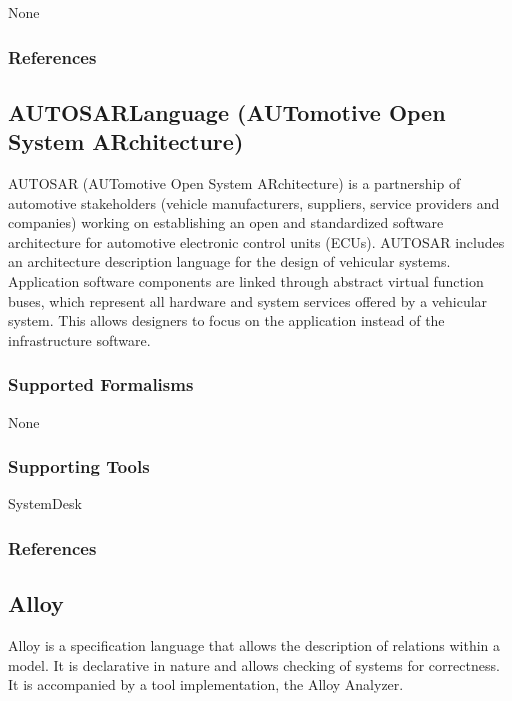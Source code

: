 None


\subsubsection{References}





\subsection{AUTOSARLanguage (AUTomotive Open System ARchitecture)}
\label{subsecL:AUTOSARLanguage}


AUTOSAR (AUTomotive Open System ARchitecture) is a partnership of automotive stakeholders (vehicle manufacturers, suppliers, service providers and companies) working on establishing an open and standardized software architecture for automotive electronic control units (ECUs). AUTOSAR includes an architecture description language for the design of vehicular systems. Application software components are linked through abstract virtual function buses, which represent all hardware and system services offered by a vehicular system. This allows designers to focus on the application instead of the infrastructure software.

\subsubsection{Supported Formalisms}

None

\subsubsection{Supporting Tools}

SystemDesk


\subsubsection{References}





\subsection{Alloy}
\label{subsecL:Alloy}


Alloy is a specification language that allows the description of relations within a model. 
It is declarative in nature and allows checking of systems for correctness.
It is accompanied by a tool implementation, the Alloy Analyzer.

